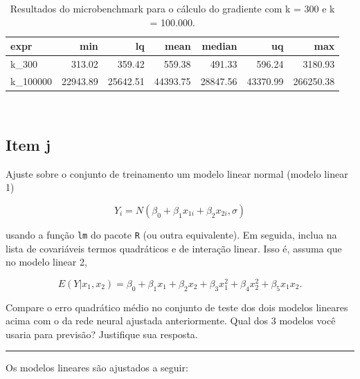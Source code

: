 \documentclass[
  a4paperpaper,
]{article}
\begin{document}
\begin{longtable}[]{@{}lrrrrrr@{}}

\caption{\label{tbl-microbenchmark}Resultados do microbenchmark para o
cálculo do gradiente com k = 300 e k = 100.000.}

\tabularnewline

\toprule\noalign{}
expr & min & lq & mean & median & uq & max \\
\midrule\noalign{}
\endhead
\bottomrule\noalign{}
\endlastfoot
k\_300 & 313.02 & 359.42 & 559.38 & 491.33 & 596.24 & 3180.93 \\
k\_100000 & 22943.89 & 25642.51 & 44393.75 & 28847.56 & 43370.99 &
266250.38 \\

\end{longtable}

~

\subsection{Item j}\label{item-j}

Ajuste sobre o conjunto de treinamento um modelo linear normal (modelo
linear 1)

\[
Y_i = N \left(\beta_0 + \beta_1 x_{1i} + \beta_2 x_{2i}, \sigma \right)
\]

usando a função \texttt{lm} do pacote \texttt{R} (ou outra equivalente).
Em seguida, inclua na lista de covariáveis termos quadráticos e de
interação linear. Isso é, assuma que no modelo linear 2,

\[
E(Y|x_1, x_2) = \beta_0 + \beta_1 x_{1} + \beta_2 x_{2} + \beta_3 x_1^2 + \beta_4 x_2^2 + \beta_5 x_1 x_2.
\]

Compare o erro quadrático médio no conjunto de teste dos dois modelos
lineares acima com o da rede neural ajustada anteriormente. Qual dos 3
modelos você usaria para previsão? Justifique sua resposta.

\begin{center}\rule{0.5\linewidth}{0.5pt}\end{center}

Os modelos lineares são ajustados a seguir:
\end{document}
